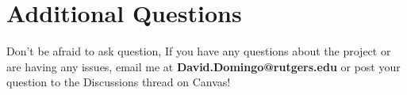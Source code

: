 \documentclass{article}
\begin{document}

\section*{Additional Questions} %
Don't be afraid to ask question, If you have any questions about the project or are having any issues, email me at \textbf{David.Domingo@rutgers.edu} or post your question to the Discussions thread on Canvas!

%
\end{document}
